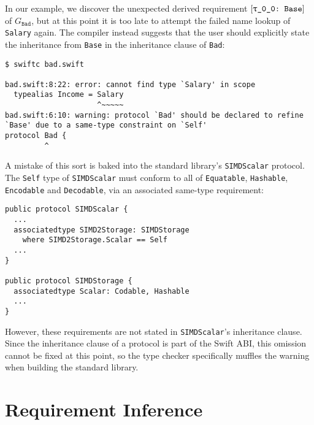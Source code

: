 \documentclass[../generics]{subfiles}
\begin{document}
In our example, we discover the unexpected derived requirement $[\texttt{\texttt{$\uptau$\_0\_0}:~Base}]$ of $G_\texttt{Bad}$, but at this point it is too late to attempt the failed name lookup of \texttt{Salary} again. The compiler instead suggests that the user should explicitly state the inheritance from \texttt{Base} in the inheritance clause of \texttt{Bad}:
\begin{Verbatim}
$ swiftc bad.swift

bad.swift:8:22: error: cannot find type `Salary' in scope
  typealias Income = Salary
                     ^~~~~~
bad.swift:6:10: warning: protocol `Bad' should be declared to refine
`Base' due to a same-type constraint on `Self'
protocol Bad {
         ^
\end{Verbatim}

A mistake of this sort is baked into the standard library's \texttt{SIMDScalar} protocol. The \texttt{Self} type of \texttt{SIMDScalar} must conform to all of \texttt{Equatable}, \texttt{Hashable}, \texttt{Encodable} and \texttt{Decodable}, via an associated same-type requirement:
\begin{Verbatim}
public protocol SIMDScalar {
  ...
  associatedtype SIMD2Storage: SIMDStorage
    where SIMD2Storage.Scalar == Self
  ...
}

public protocol SIMDStorage {
  associatedtype Scalar: Codable, Hashable
  ...
}
\end{Verbatim}
However, these requirements are not stated in \texttt{SIMDScalar}'s inheritance clause. Since the inheritance clause of a protocol is part of the Swift ABI, this omission cannot be fixed at this point, so the type checker specifically muffles the warning when building the standard library.

\section{Requirement Inference}\label{requirementinference}
\end{document}
